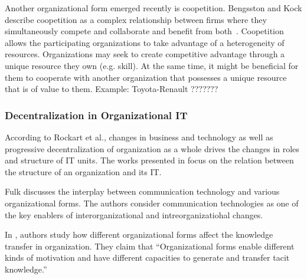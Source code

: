 Another organizational form emerged recently is coopetition. Bengsston and Kock describe coopetition as a complex relationship between firms where they simultaneously compete and collaborate and benefit from both~\cite{Bengtsson2000}. Coopetition allows the participating organizations to take advantage of a heterogeneity of resources. Organizations may seek to create competitive advantage through a unique resource they own (e.g. skill). At the same time, it might be beneficial for them to cooperate with another organization that possesses a unique resource that is of value to them. Example: Toyota-Renault ???????




\subsubsection{Decentralization in Organizational IT}
According to Rockart et al.\cite{Rockart1996}, changes in business and technology as well as progressive decentralization of organization as a whole drives the changes in roles and structure  of IT units. The works presented in \cite{fulk1995, osterloh2000, Rockart1996, Weill2004} focus on the relation between the structure of an organization and its IT. 

Fulk \cite{fulk1995} discusses the interplay between communication technology and various organizational forms. The authors consider communication technologies as one of the key enablers of interorganizational and intreorganizatiohal changes.

In \cite{osterloh2000}, authors study how different organizational forms affect the knowledge transfer in organization. They claim that “Organizational forms enable different kinds of motivation and have different capacities to generate and transfer tacit knowledge.”

